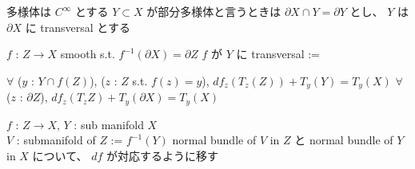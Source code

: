 \documentclass[dvipdfmx]{jsarticle}
\begin{document}
\begin{When}
\itemwhen
  多様体は \(C^\infty\) とする
\itemwhen
  \(Y \subset X\) が部分多様体と言うときは \(\partial X \cap Y = \partial Y\) とし、 \(Y\) は \(\partial X\) に transversal とする
\end{When}

\begin{Definition}
\itemwhen
  \For \(f\) : \(Z \to X\) smooth s.t. \(f^{-1}(\partial X) = \partial Z\)
\itemdefi
  \Define \(f\) が \(Y\) に transversal :=
  \begin{itemize}
    \itemwith \(\forall\) (\(y\) : \(Y \cap f(Z)\)), (\(z\) : \(Z\) s.t. \(f(z) = y\)), \(df_z(T_z (Z)) + T_y(Y) = T_y(X)\)
    \itemwith \(\forall\) (\(z\) : \(\partial Z\)), \(d f_z(T_z Z) + T_y(\partial X) = T_y(X)\)
  \end{itemize}
\end{Definition}

\begin{Theorem}
\itemwhen
  \For \(f\) : \(Z \to X\), \(Y\) : sub manifold \(X\) \\
  \Let \(V\) : submanifold of \(Z\) := \(f^{-1}(Y)\) 
\itemprop
  \Then normal bundle of \(V\) in \(Z\) と normal bundle of \(Y\) in \(X\) について、 \(df\) が対応するように移す
\end{Theorem}
\end{document}
